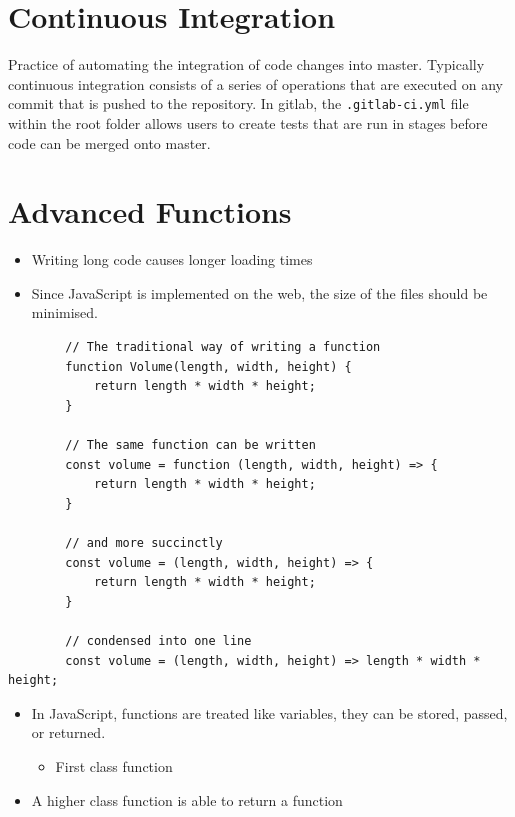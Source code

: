 \documentclass{report}
\begin{document}
\chapter{Continuous Integration}

	Practice of automating the integration of code changes into master. Typically continuous integration consists of a series of operations that are executed on any commit that is pushed to the repository. In gitlab, the \texttt{.gitlab-ci.yml} file within the root folder allows users to create tests that are run in stages before code can be merged onto master.

\chapter{Advanced Functions}

	\begin{itemize}
		\item Writing long code causes longer loading times
		\item Since JavaScript is implemented on the web, the size of the files should be minimised.
	\end{itemize}

	\begin{verbatim}
		// The traditional way of writing a function
		function Volume(length, width, height) {
			return length * width * height;
		}

		// The same function can be written 
		const volume = function (length, width, height) => {
			return length * width * height;
		}

		// and more succinctly
		const volume = (length, width, height) => {
			return length * width * height;
		}

		// condensed into one line
		const volume = (length, width, height) => length * width * height;

	\end{verbatim}

	\begin{itemize}
		\item In JavaScript, functions are treated like variables, they can be stored, passed, or returned.
			\begin{itemize}
				\item First class function
			\end{itemize}
		\item A higher class function is able to return a function
	\end{itemize}
\end{document}
